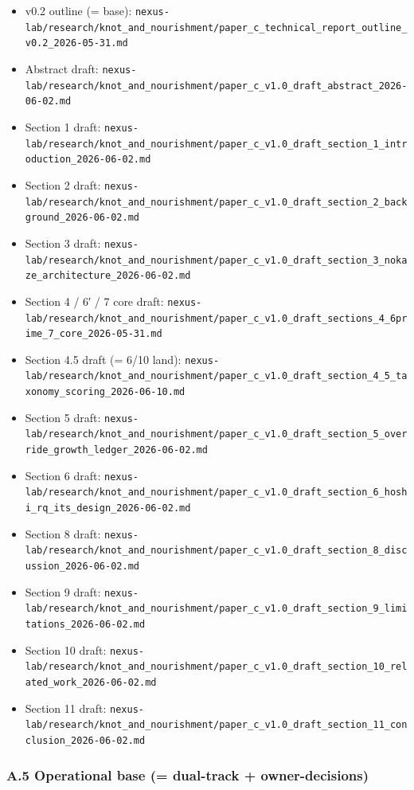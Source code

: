 \documentclass[
]{article}
\providecommand{\tightlist}{%
  \setlength{\itemsep}{0pt}\setlength{\parskip}{0pt}}
\begin{document}
\begin{itemize}
\tightlist
\item
  v0.2 outline (= base):
  \texttt{nexus-lab/research/knot\_and\_nourishment/paper\_c\_technical\_report\_outline\_v0.2\_2026-05-31.md}
\item
  Abstract draft:
  \texttt{nexus-lab/research/knot\_and\_nourishment/paper\_c\_v1.0\_draft\_abstract\_2026-06-02.md}
\item
  Section 1 draft:
  \texttt{nexus-lab/research/knot\_and\_nourishment/paper\_c\_v1.0\_draft\_section\_1\_introduction\_2026-06-02.md}
\item
  Section 2 draft:
  \texttt{nexus-lab/research/knot\_and\_nourishment/paper\_c\_v1.0\_draft\_section\_2\_background\_2026-06-02.md}
\item
  Section 3 draft:
  \texttt{nexus-lab/research/knot\_and\_nourishment/paper\_c\_v1.0\_draft\_section\_3\_nokaze\_architecture\_2026-06-02.md}
\item
  Section 4 / 6′ / 7 core draft:
  \texttt{nexus-lab/research/knot\_and\_nourishment/paper\_c\_v1.0\_draft\_sections\_4\_6prime\_7\_core\_2026-05-31.md}
\item
  Section 4.5 draft (= 6/10 land):
  \texttt{nexus-lab/research/knot\_and\_nourishment/paper\_c\_v1.0\_draft\_section\_4\_5\_taxonomy\_scoring\_2026-06-10.md}
\item
  Section 5 draft:
  \texttt{nexus-lab/research/knot\_and\_nourishment/paper\_c\_v1.0\_draft\_section\_5\_override\_growth\_ledger\_2026-06-02.md}
\item
  Section 6 draft:
  \texttt{nexus-lab/research/knot\_and\_nourishment/paper\_c\_v1.0\_draft\_section\_6\_hoshi\_rq\_its\_design\_2026-06-02.md}
\item
  Section 8 draft:
  \texttt{nexus-lab/research/knot\_and\_nourishment/paper\_c\_v1.0\_draft\_section\_8\_discussion\_2026-06-02.md}
\item
  Section 9 draft:
  \texttt{nexus-lab/research/knot\_and\_nourishment/paper\_c\_v1.0\_draft\_section\_9\_limitations\_2026-06-02.md}
\item
  Section 10 draft:
  \texttt{nexus-lab/research/knot\_and\_nourishment/paper\_c\_v1.0\_draft\_section\_10\_related\_work\_2026-06-02.md}
\item
  Section 11 draft:
  \texttt{nexus-lab/research/knot\_and\_nourishment/paper\_c\_v1.0\_draft\_section\_11\_conclusion\_2026-06-02.md}
\end{itemize}

\subsubsection{A.5 Operational base (= dual-track +
owner-decisions)}\label{a.5-operational-base-dual-track-owner-decisions}
\end{document}
